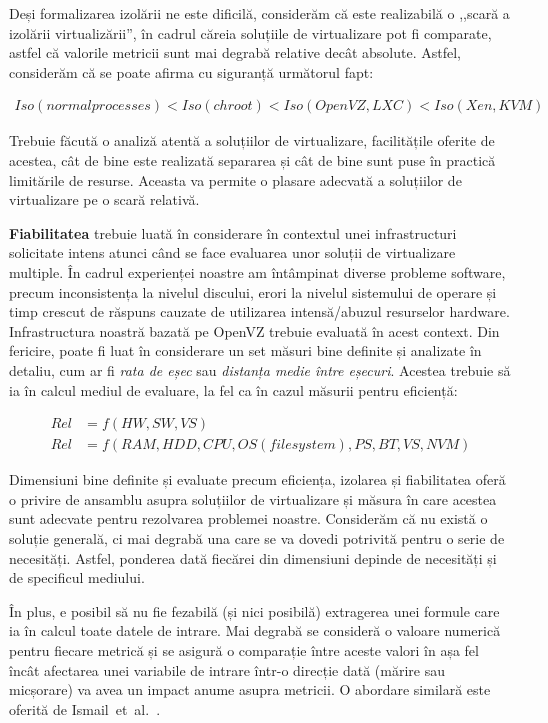 Deși formalizarea izolării ne este dificilă, considerăm că este realizabilă
o ,,scară a izolării virtualizării'', în cadrul căreia soluțiile de
virtualizare pot fi comparate, astfel că valorile metricii sunt mai degrabă
relative decât absolute. Astfel, considerăm că se poate afirma cu 
siguranță următorul fapt:

\begin{align}
Iso(normal processes) < Iso(chroot) < Iso(OpenVZ, LXC) < Iso(Xen,KVM)
\end{align}

Trebuie făcută o analiză atentă a soluțiilor de virtualizare, facilitățile
oferite de acestea, cât de bine este realizată separarea și cât de bine
sunt puse în practică limitările de resurse. Aceasta va permite o plasare
adecvată a soluțiilor de virtualizare pe o scară relativă.

\textbf{Fiabilitatea} trebuie luată în considerare în contextul unei
infrastructuri solicitate intens atunci când se face evaluarea unor soluții
de virtualizare multiple. În cadrul experienței noastre am întâmpinat
diverse probleme software, precum inconsistența la nivelul discului, erori
la nivelul sistemului de operare și timp crescut de răspuns cauzate de
utilizarea intensă/abuzul resurselor hardware. Infrastructura noastră
bazată pe OpenVZ trebuie evaluată în acest context. Din fericire, poate fi
luat în considerare un set măsuri bine definite și analizate în detaliu,
cum ar fi \textit{rata de eșec} sau \textit{distanța medie între eșecuri}.
Acestea trebuie să ia în calcul mediul de evaluare, la fel ca în cazul
măsurii pentru eficiență:

\begin{align}
Rel & = f(HW, SW, VS)\\
Rel & = f(RAM, HDD, CPU, OS (filesystem), PS, BT, VS, NVM)
\end{align}

Dimensiuni bine definite și evaluate precum eficiența, izolarea și
fiabilitatea oferă o privire de ansamblu asupra soluțiilor de virtualizare
și măsura în care acestea sunt adecvate pentru rezolvarea problemei noastre.
Considerăm că nu există o soluție generală, ci mai degrabă una care se
va dovedi potrivită pentru o serie de necesități. Astfel, ponderea
dată fiecărei din dimensiuni depinde de necesități și de specificul
mediului.

În plus, e posibil să nu fie fezabilă (și nici posibilă) extragerea unei
formule care ia în calcul toate datele de intrare. Mai degrabă se consideră
o valoare numerică pentru fiecare metrică și se asigură o comparație între
aceste valori în așa fel încât afectarea unei variabile de intrare într-o
direcție dată (mărire sau micșorare) va avea un impact anume asupra
metricii. O abordare similară este oferită de
Ismail~et~al.~\cite{virt-metrics}.

